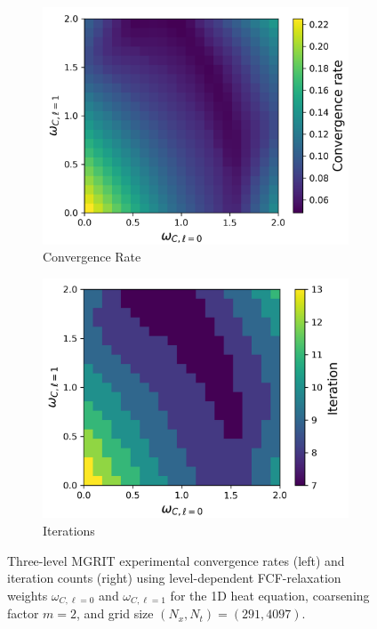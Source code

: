 \documentclass[VANCOUVER,STIX1COL]{WileyNJD-v2}
\begin{document}
\begin{figure}[h!]
    \centering
    \begin{subfigure}[b]{0.4\textwidth}
    \includegraphics[width=\textwidth]{images/Heat1D_4097_Multi_Weights_Conv.png}
    \caption{\normalsize Convergence Rate}
    \end{subfigure}
     \begin{subfigure}[b]{0.4\textwidth}
    \includegraphics[width=\textwidth]{images/Heat1D_4097_Multi_Weights_Iter.png}
    \caption{\normalsize Iterations}
    \end{subfigure}
    \caption{Three-level MGRIT experimental convergence rates (left) and iteration counts (right) using level-dependent FCF-relaxation weights $\omega_{C,\ell=0}$ and $\omega_{C,\ell=1}$ for the 1D heat equation, coarsening factor $m=2$, and grid size $(N_x, N_t) = (291, 4097)$.}
    \label{fig: Heat1D Multilevel Weight Three-level}
\end{figure}
\end{document}
